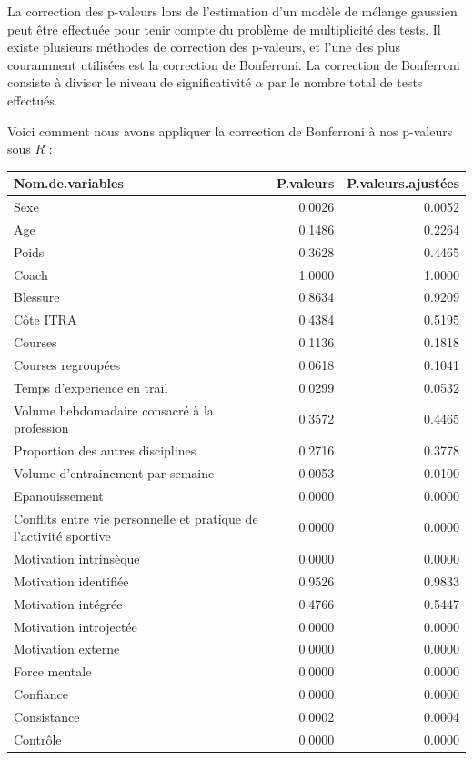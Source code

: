 \documentclass[
]{article}
\begin{document}
La correction des p-valeurs lors de l'estimation d'un modèle de mélange
gaussien peut être effectuée pour tenir compte du problème de
multiplicité des tests. Il existe plusieurs méthodes de correction des
p-valeurs, et l'une des plus couramment utilisées est la correction de
Bonferroni. La correction de Bonferroni consiste à diviser le niveau de
significativité \(\alpha\) par le nombre total de tests effectués.

Voici comment nous avons appliquer la correction de Bonferroni à nos
p-valeurs sous \(R\) :

\begin{longtable}{lrr}
\toprule
Nom.de.variables & P.valeurs & P.valeurs.ajustées \\ 
\midrule\addlinespace[2.5pt]
Sexe & 0.0026 & 0.0052 \\ 
Age & 0.1486 & 0.2264 \\ 
Poids & 0.3628 & 0.4465 \\ 
Coach & 1.0000 & 1.0000 \\ 
Blessure & 0.8634 & 0.9209 \\ 
Côte ITRA & 0.4384 & 0.5195 \\ 
Courses & 0.1136 & 0.1818 \\ 
Courses regroupées & 0.0618 & 0.1041 \\ 
Temps d'experience en trail & 0.0299 & 0.0532 \\ 
Volume hebdomadaire consacré à la profession & 0.3572 & 0.4465 \\ 
Proportion des autres disciplines & 0.2716 & 0.3778 \\ 
Volume d'entrainement par semaine & 0.0053 & 0.0100 \\ 
Epanouissement & 0.0000 & 0.0000 \\ 
Conflits entre vie personnelle et pratique de l’activité sportive & 0.0000 & 0.0000 \\ 
Motivation intrinsèque & 0.0000 & 0.0000 \\ 
Motivation identifiée & 0.9526 & 0.9833 \\ 
Motivation intégrée & 0.4766 & 0.5447 \\ 
Motivation introjectée & 0.0000 & 0.0000 \\ 
Motivation externe & 0.0000 & 0.0000 \\ 
Force mentale & 0.0000 & 0.0000 \\ 
Confiance & 0.0000 & 0.0000 \\ 
Consistance & 0.0002 & 0.0004 \\ 
Contrôle & 0.0000 & 0.0000 \\ 

\end{longtable}
\end{document}
